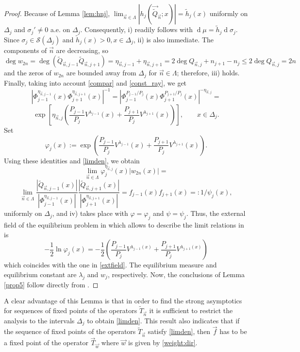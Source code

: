 \documentclass{amsart}
\numberwithin{equation}{section}
\theoremstyle{definition}
\DeclareMathOperator{\D}{d}        %
\newcommand{\n}{\vec{n}}          %
\begin{document}
\begin{proof}
   Because of Lemma \ref{lem:hnj}, $\lim_{\n \in \Lambda} | {h}_{j}( {\vec{\tilde{Q}}_{\n}};x)| = \tilde{h}_j(x)$ uniformly on $\Delta_j$ and $ \sigma_j' \neq 0 $ a.e. on $\Delta_j$. Consequently, i) readily follows with $\D \mu = \tilde{h}_j  \D \sigma_j$. Since $\sigma_j \in \mathcal{S}(\Delta_j)$ and $\tilde{h}_j(x) > 0, x \in \Delta_j$, ii) is also immediate.  The components of $\n$ are decreasing, so
    \[ \deg w_{2n} = \deg(\tilde{Q}_{\n,j-1} \tilde{Q}_{\n,j+1}) = \eta_{\n,j-1} + \eta_{\n,j+1} = 2 \deg Q_{\n,j} + n_{j+1} - n_j \leq 2 \deg Q_{\n,j} = 2n
    \]
    and the zeros of $w_{2n}$ are bounded away from $\Delta_{j}$ for $\n \in \Lambda$; therefore, iii) holds. Finally,  taking into account  \eqref{compar} and \eqref{const_ray}, we get
    \[  \left|\Phi_{j-1}^{\eta_{\n,j-1}}(x)\Phi_{j+1}^{\eta_{\n,j+1}}(x)\right|^{-1} = \left|\Phi_{j-1}^{P_{j-1}/P_j}(x)\Phi_{j+1}^{P_{j+1}/P_j}(x)\right|^{-\eta_{\n,j}} =
    \]
    \[\exp\left[\eta_{\n,j}\left( \frac{P_{j-1}}{P_j} V^{\lambda_{j-1}}(x) +  \frac{P_{j+1}}{P_j} V^{\lambda_{j+1}}(x)\right)\right], \qquad x \in \Delta_j.
    \]
    Set
    \[ \varphi_j (x) := \exp \left( \frac{P_{j-1}}{P_j} V^{\lambda_{j-1}}(x) +  \frac{P_{j+1}}{P_j} V^{\lambda_{j+1}}(x)\right).
    \]
    Using these identities and \eqref{limden}, we obtain
    \[ \lim_{\n \in \Lambda}  \varphi_j^{\eta_{\n,j}} (x)  |w_{2n}(x)| =
    \]
   \[ \lim_{\n \in \Lambda} \frac{|\tilde{Q}_{\n,j-1}(x)|}{|\Phi_{j-1}^{\eta_{\n,j-1}}(x)|}\frac{ | \tilde{Q}_{\n,j+1}(x)|}{|\Phi_{j+1}^{\eta_{\n,j+1}}(x)|} = f_{j-1}(x) f_{j+1}(x) =: 1/\psi_j(x),
   \]
   uniformly on $\Delta_j$,  and iv) takes place with $\varphi = \varphi_j$ and $\psi = \psi_j$.
Thus, the external field of the equilibrium problem in   \cite[(1.5)]{LGLago} which allows to describe the limit relations in \cite[Th. 1.2]{LGLago} is
\[ -\frac{1}{2} \ln \varphi_j(x) =  - \frac{1}{2}\left( \frac{P_{j-1}}{P_j}V^{\lambda_{j-1}(x)} + \frac{P_{j+1}}{P_j}V^{\lambda_{j+1}(x)} \right)
\]
which coincides with the one in \eqref{extfield}. The equilibrium measure and equilibrium constant are $\lambda_j$ and $w_j$, respectively. Now, the conclusions of Lemma \ref{prop5} follow directly from \cite[Th. 1.2]{LGLago}.
    \end{proof}

A clear advantage of this Lemma is that in order to find the strong asymptotics for sequences of fixed points of the operators $\tilde{T}_{\n}$ it is sufficient to restrict the analysis to the intervals $\Delta_j$ to obtain \eqref{limden}. This result also indicates that if the sequence of fixed points of the operators $\tilde{T}_{\n}$ satisfy \eqref{limden}, then
$\vec{f}$ has to be a fixed point of the operator $\vec{T}_{\vec{w}}$ where $\vec{w}$ is given by \eqref{weight:dir}.
\end{document}
